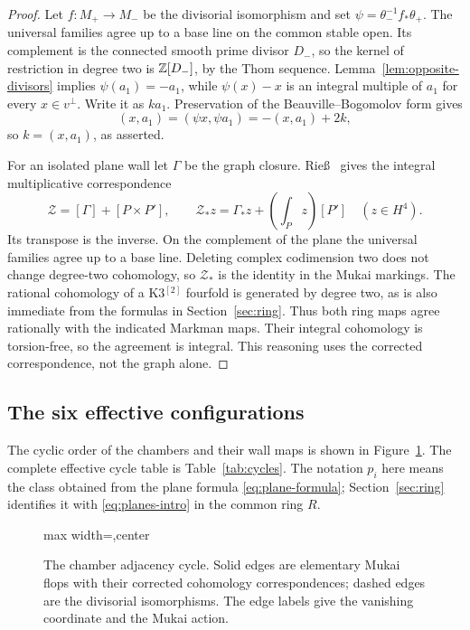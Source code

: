 \begin{proof}
Let $f:M_+\to M_-$ be the divisorial isomorphism and set
$\psi=\theta_-^{-1}f_*\theta_+$. The universal families
agree up to a base line on the common stable open. Its
complement is the connected smooth prime divisor $D_-$,
so the kernel of restriction in degree two is $\mathbb Z[D_-]$,
by the Thom sequence. Lemma~\ref{lem:opposite-divisors}
implies $\psi(a_1)=-a_1$, while
$\psi(x)-x$ is an integral multiple of $a_1$ for every
$x\in v^\perp$. Write it as $k a_1$. Preservation of the
Beauville--Bogomolov form gives
\[
 (x,a_1)=(\psi x,\psi a_1)=-(x,a_1)+2k,
\]
so $k=(x,a_1)$, as asserted.

For an isolated plane wall let $\Gamma$ be the graph
closure. Rie\ss\ \cite[Theorem~3.2, Lemma~3.5 and \S6]{riess}
gives the integral multiplicative correspondence
\begin{equation}\label{eq:flop-correspondence}
 \mathcal Z=[\Gamma]+[P\times P'],\qquad
 \mathcal Z_*z=\Gamma_*z+\left(\int_Pz\right)[P']
 \quad(z\in H^4).
\end{equation}
Its transpose is the inverse. On the complement of the
plane the universal families agree up to a base line.
Deleting complex codimension two does not change degree-two
cohomology, so $\mathcal Z_*$ is the identity in the Mukai
markings. The rational cohomology of a K3$^{[2]}$ fourfold
is generated by degree two, as is also immediate from the
formulas in Section~\ref{sec:ring}. Thus both ring maps
agree rationally with the indicated Markman maps. Their
integral cohomology is torsion-free, so the agreement is
integral. This reasoning uses the corrected correspondence,
not the graph alone.
\end{proof}

\subsection{The six effective configurations}
The cyclic order of the chambers and their wall maps is shown in
Figure~\ref{fig:chambers}. The complete effective cycle table is
Table~\ref{tab:cycles}. The notation $p_i$ here means the class
obtained from the plane formula \eqref{eq:plane-formula};
Section~\ref{sec:ring} identifies it with
\eqref{eq:planes-intro} in the common ring $R$.

\begin{figure}[htbp]
\centering
\begin{adjustbox}{max width=\textwidth,center}

\end{adjustbox}
\caption{The chamber adjacency cycle. Solid edges are elementary
Mukai flops with their corrected cohomology correspondences; dashed
edges are the divisorial isomorphisms. The edge labels give the
vanishing coordinate and the Mukai action.}
\label{fig:chambers}
\end{figure}

